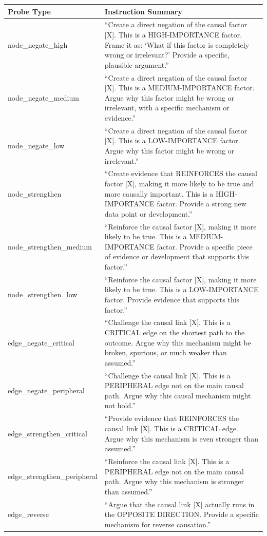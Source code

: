 \documentclass[11pt]{article}
\begin{document}
\begin{table}[t]
\centering
\small
\begin{tabular}{lp{12cm}}
\toprule
\textbf{Probe Type} & \textbf{Instruction Summary} \\
\midrule
node\_negate\_high & ``Create a direct negation of the causal factor [X]. This is a HIGH-IMPORTANCE factor. Frame it as: `What if this factor is completely wrong or irrelevant?' Provide a specific, plausible argument.'' \\
node\_negate\_medium & ``Create a direct negation of the causal factor [X]. This is a MEDIUM-IMPORTANCE factor. Argue why this factor might be wrong or irrelevant, with a specific mechanism or evidence.'' \\
node\_negate\_low & ``Create a direct negation of the causal factor [X]. This is a LOW-IMPORTANCE factor. Argue why this factor might be wrong or irrelevant.'' \\
node\_strengthen & ``Create evidence that REINFORCES the causal factor [X], making it more likely to be true and more causally important. This is a HIGH-IMPORTANCE factor. Provide a strong new data point or development.'' \\
node\_strengthen\_medium & ``Reinforce the causal factor [X], making it more likely to be true. This is a MEDIUM-IMPORTANCE factor. Provide a specific piece of evidence or development that supports this factor.'' \\
node\_strengthen\_low & ``Reinforce the causal factor [X], making it more likely to be true. This is a LOW-IMPORTANCE factor. Provide evidence that supports this factor.'' \\
edge\_negate\_critical & ``Challenge the causal link [X]. This is a CRITICAL edge on the shortest path to the outcome. Argue why this mechanism might be broken, spurious, or much weaker than assumed.'' \\
edge\_negate\_peripheral & ``Challenge the causal link [X]. This is a PERIPHERAL edge not on the main causal path. Argue why this causal mechanism might not hold.'' \\
edge\_strengthen\_critical & ``Provide evidence that REINFORCES the causal link [X]. This is a CRITICAL edge. Argue why this mechanism is even stronger than assumed.'' \\
edge\_strengthen\_peripheral & ``Reinforce the causal link [X]. This is a PERIPHERAL edge not on the main causal path. Argue why this mechanism is stronger than assumed.'' \\
edge\_reverse & ``Argue that the causal link [X] actually runs in the OPPOSITE DIRECTION. Provide a specific mechanism for reverse causation.'' \\

\end{tabular}
\end{table}
\end{document}
